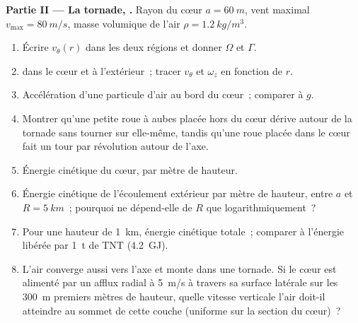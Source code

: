 \begin{problem}
\medskip
\noindent\textbf{Partie II --- La tornade, .}
Rayon du cœur $a = \qty{60}{m}$, vent maximal $v_{\max} = \qty{80}{m/s}$, masse
volumique de l'air $\rho = \qty{1.2}{kg/m^3}$.
\begin{enumerate}[resume]
  \item Écrire $v_\theta(r)$ dans les deux régions et donner $\Omega$ et $\Gamma$.
  \item {} dans le cœur et à l'extérieur~; tracer $v_\theta$ et $\omega_z$
        en fonction de $r$.
  \item Accélération d'une particule d'air au bord du cœur~;
        comparer à $g$.
  \item Montrer qu'une petite roue à aubes placée hors du cœur dérive
        autour de la tornade sans tourner sur elle-même, tandis qu'une roue
        placée dans le cœur fait un tour par révolution autour de
        l'axe.
  \item Énergie cinétique du cœur, par mètre de hauteur.
  \item Énergie cinétique de l'écoulement extérieur par mètre de hauteur, entre
        $a$ et $R = \qty{5}{km}$~; pourquoi ne dépend-elle de $R$ que
        logarithmiquement~?
  \item Pour une hauteur de \qty{1}{km}, énergie cinétique totale~; comparer à
        l'énergie libérée par \qty{1}{t} de TNT (\qty{4.2}{GJ}).
  \item L'air converge aussi vers l'axe et monte dans une tornade. Si le cœur
        est alimenté par un afflux radial à \qty{5}{m/s} à travers sa surface
        latérale sur les \qty{300}{m} premiers mètres de hauteur, quelle vitesse verticale
        l'air doit-il atteindre au sommet de cette couche (uniforme
        sur la section du cœur)~?
\end{enumerate}


\end{problem}
